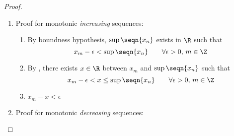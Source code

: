 \begin{theorem}
\end{theorem}
\begin{proof}
\attention
\begin{enumerate}
  \item Proof for monotonic \emph{increasing} sequences:
    \begin{enumerate}
      \item By boundness hypothesis, $\sup\seqn{x_n}$ exists in $\R$ such that
        \[x_m-\epsilon < \sup\seqn{x_n} \qquad \forall \epsilon>0,\, m\in\Z  \]

      \item By , there exists $x\in\R$ between $x_m$ and $\sup\seqn{x_n}$ such that
        \[x_m-\epsilon < x \le \sup\seqn{x_n}  \qquad \forall \epsilon>0,\, m\in\Z  \]

      \item $x_m-x < \epsilon $
    \end{enumerate}

  \item Proof for monotonic \emph{decreasing} sequences:

\end{enumerate}

\end{proof}


%


